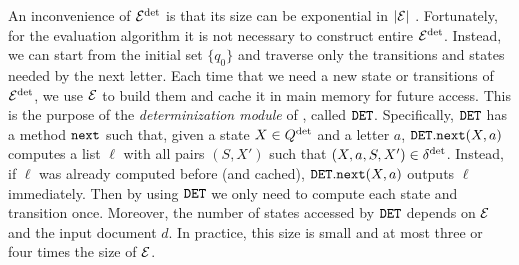 An inconvenience of $\mathcal{E}^{{\operatorname{det}}}$ is that its size can be exponential in $|\mathcal{E}|$
\citep{HopcroftU79}. Fortunately, for the evaluation algorithm it is not
necessary to construct %
entire $\mathcal{E}^{{\operatorname{det}}}$. Instead, we can start from the initial set $\{q_0\}$ and
traverse only the transitions and states needed by the next letter. Each time
that we need a new state or transitions of $\mathcal{E}^{{\operatorname{det}}}$, we use $\mathcal{E}$ to build
them and cache it in main memory for future access. This is the purpose of the
\emph{determinization module} of \rematch, called $\mathtt{DET}$. Specifically, $\mathtt{DET}$
has a method $\texttt{next}$ such that, given a state $X \in Q^{\operatorname{det}}$ and a letter
$a$, $\mathtt{DET}.\texttt{next}(X, a)$ computes a list $\ell$ with all pairs $(S, X')$
such that $(X,a,S,X') \in \delta^{\operatorname{det}}$. Instead, if $\ell$ was already computed
before (and cached), $\mathtt{DET}.\texttt{next}(X, a)$ outputs $\ell$ immediately. Then by
using $\mathtt{DET}$ we only need to compute each state and transition once. Moreover,
the number of states accessed by $\mathtt{DET}$ depends on $\mathcal{E}$ and the input document
$d$. In practice, this size is small and at most three or four times the size of
$\mathcal{E}$.

